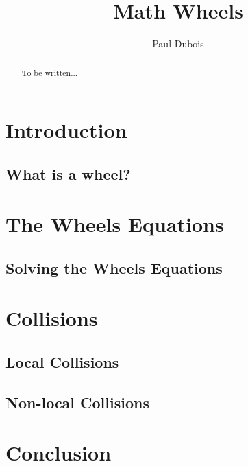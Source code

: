 \documentclass[]{article}
\title{Math Wheels}
\author{Paul Dubois}
\begin{document}
	
	\maketitle
	
	\begin{abstract}
		To be written...
	\end{abstract}
	
	\section{Introduction}
	\subsection{What is a wheel?}
	
	\section{The Wheels Equations}
	\subsection{Solving the Wheels Equations}
	
	\section{Collisions}
	\subsection{Local Collisions}
	\subsection{Non-local Collisions}
	
	\section{Conclusion}
	
\end{document}
